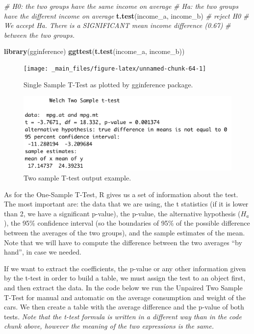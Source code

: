 \documentclass[
]{article}
\newenvironment{Shaded}{\begin{snugshade}}{\end{snugshade}}
\newcommand{\CommentTok}[1]{\textcolor[rgb]{0.56,0.35,0.01}{\textit{#1}}}
\newcommand{\FunctionTok}[1]{\textcolor[rgb]{0.13,0.29,0.53}{\textbf{#1}}}
\newcommand{\NormalTok}[1]{#1}
\begin{document}
\begin{Shaded}
\begin{Highlighting}[]
\CommentTok{\# H0: the two groups have the same income on average}
\CommentTok{\# Ha: the two groups have the different income on average}
\FunctionTok{t.test}\NormalTok{(income\_a, income\_b) }\CommentTok{\# reject H0}
\CommentTok{\# We accept Ha. There is a SIGNIFICANT mean income difference (0.67)}
\CommentTok{\# between the two groups.}

\FunctionTok{library}\NormalTok{(gginference)}
\FunctionTok{ggttest}\NormalTok{(}\FunctionTok{t.test}\NormalTok{(income\_a, income\_b))}
\end{Highlighting}
\end{Shaded}

\begin{figure}[H]

{\centering \texttt{[image: \_main\_files/figure-latex/unnamed-chunk-64-1]} 

}

\caption{Single Sample T-Test as plotted by gginference package.}\label{fig:unnamed-chunk-64}
\end{figure}

\begin{figure}[H]

{\centering \includegraphics[width=0.5\linewidth,]{images/Schermata 2022-03-29 alle 16.36.10} 

}

\caption{Two sample T-test output example.}\label{fig:unnamed-chunk-65}
\end{figure}

As for the One-Sample T-Test, R gives us a set of information about the
test. The most important are: the data that we are using, the t
statistics (if it is lower than 2, we have a significant p-value), the
p-value, the alternative hypothesis (\(H_a\)), the 95\% confidence interval
(so the boundaries of 95\% of the possible difference between the
averages of the two groups), and the sample estimates of the mean. Note
that we will have to compute the difference between the two averages ``by
hand'', in case we needed.

If we want to extract the coefficients, the p-value or any other
information given by the t-test in order to build a table, we must
assign the test to an object first, and then extract the data. In the
code below we run the Unpaired Two Sample T-Test for manual and
automatic on the average consumption and weight of the cars. We then
create a table with the average difference and the p-value of both
tests. \emph{Note that the t-test formula is written in a different way than
in the code chunk above, however the meaning of the two expressions is
the same.}
\end{document}
